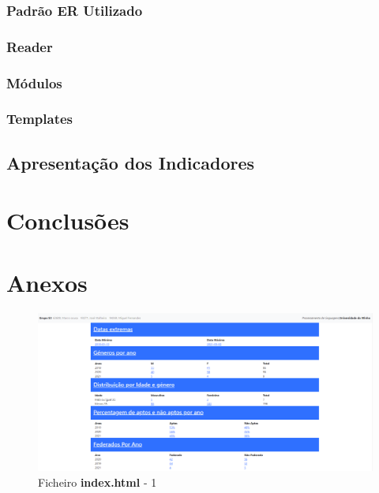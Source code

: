 \documentclass[runningheads]{llncs}
\begin{document}


\subsubsection{Padrão ER Utilizado} \label{subsubsec:padrao}



\subsubsection{Reader}\label{subsubsec:reader}



\subsubsection{Módulos}\label{subsubsec:modulos}



\subsubsection{Templates} \label{subsubsec:templates}



\subsection{Apresentação dos Indicadores} \label{subsec:indicadores}



\section{Conclusões} 



\section{Anexos}\label{sec:anexos}
\begin{figure}
    \centering
    \includegraphics[width=\linewidth]{assets/index1.png}
    \caption{Ficheiro \textbf{index.html} - 1}
    \label{fig:index.html1}
\end{figure}
\end{document}
